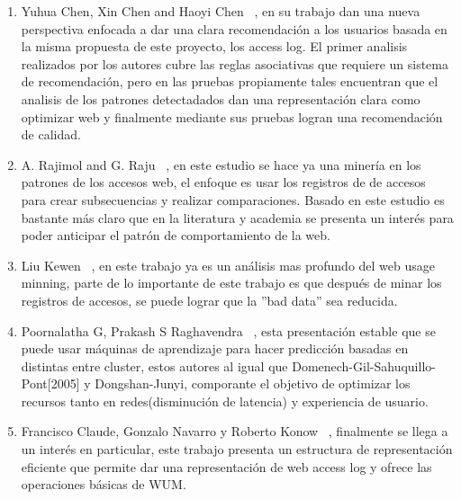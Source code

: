 \documentclass{udparticle}
\begin{document}
\begin{enumerate}
  \item Yuhua Chen, Xin Chen and Haoyi Chen ~\cite{yuhua}, en su trabajo dan una nueva perspectiva enfocada a dar una clara recomendación a los usuarios basada en la misma propuesta de este proyecto, los access log. El primer analisis realizados por los autores cubre las reglas asociativas que requiere un sistema de recomendación, pero en las pruebas propiamente tales encuentran que el analisis de los patrones detectadados dan una representación clara como optimizar web y finalmente mediante sus pruebas logran una recomendación de calidad.


  \item A. Rajimol and G. Raju ~\cite{rajimol}, en este estudio se hace ya una minería en los patrones de los accesos web, el enfoque es usar los registros de de accesos para crear subsecuencias y realizar comparaciones. Basado en este estudio es bastante más claro que en la literatura y academia se presenta un interés para poder anticipar el patrón de comportamiento de la web.



  \item Liu Kewen ~\cite{kewen}, en este trabajo ya es un análisis mas profundo del web usage minning, parte de lo importante de este trabajo es que después de minar los registros de accesos, se puede lograr que  la ''bad data'' sea reducida.



  \item Poornalatha G, Prakash S Raghavendra ~\cite{prakash}, esta presentación estable que se puede usar máquinas de aprendizaje para hacer predicción basadas en distintas entre cluster, estos autores al igual que Domenech-Gil-Sahuquillo-Pont[2005] y  Dongshan-Junyi, comporante el objetivo de optimizar los recursos tanto en redes(disminución de latencia) y experiencia de usuario.


  \item Francisco Claude, Gonzalo Navarro y Roberto Konow  ~\cite{BWT}, finalmente se llega a un interés en particular, este trabajo presenta un estructura de representación eficiente que permite dar una representación de web access log y ofrece las operaciones básicas de WUM. 


\end{enumerate}
\end{document}
